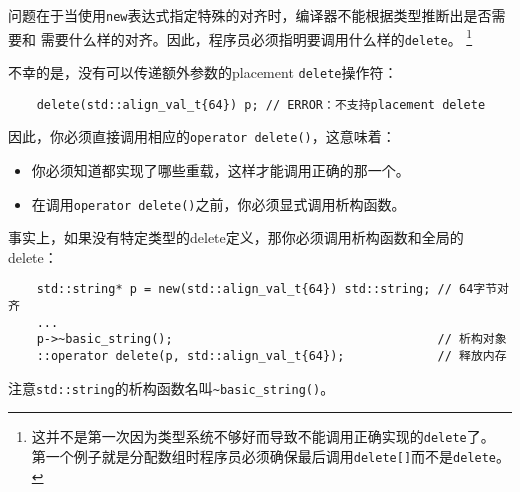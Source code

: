 问题在于当使用\texttt{new}表达式指定特殊的对齐时，编译器不能根据类型推断出是否需要和
需要什么样的对齐。因此，程序员必须指明要调用什么样的\texttt{delete}。
\footnote{这并不是第一次因为类型系统不够好而导致不能调用正确实现的\texttt{delete}了。
第一个例子就是分配数组时程序员必须确保最后调用\texttt{delete[]}而不是\texttt{delete}。}

不幸的是，没有可以传递额外参数的placement \texttt{delete}操作符：
\begin{lstlisting}
    delete(std::align_val_t{64}) p; // ERROR：不支持placement delete
\end{lstlisting}
因此，你必须直接调用相应的\texttt{operator delete()}，这意味着：
\begin{itemize}
    \item 你必须知道都实现了哪些重载，这样才能调用正确的那一个。
    \item 在调用\texttt{operator delete()}之前，你必须显式调用析构函数。
\end{itemize}
事实上，如果没有特定类型的delete定义，那你必须调用析构函数和全局的delete：
\begin{lstlisting}
    std::string* p = new(std::align_val_t{64}) std::string; // 64字节对齐
    ...
    p->~basic_string();                                     // 析构对象
    ::operator delete(p, std::align_val_t{64});             // 释放内存
\end{lstlisting}
注意\texttt{std::string}的析构函数名叫\texttt{\textasciitilde basic\_string()}。

